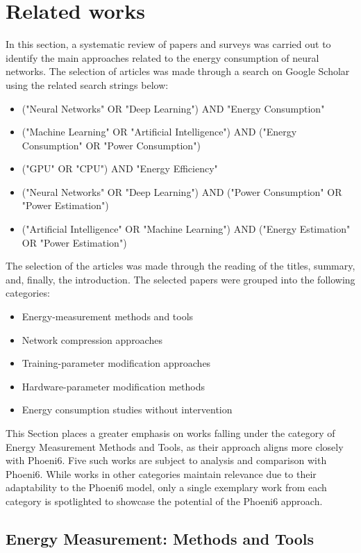 \section{Related works}
\label{sec:related-works}
In this section, a systematic review of papers and surveys was carried out to identify the main approaches related to the energy consumption of neural networks. The selection of articles was made through a search on Google Scholar using the related search strings below:

 \begin{itemize}
    \item ("Neural Networks" OR "Deep Learning") AND "Energy Consumption"
    \item ("Machine Learning" OR "Artificial Intelligence") AND ("Energy Consumption" OR "Power Consumption")
    \item ("GPU" OR "CPU") AND "Energy Efficiency"
    \item ("Neural Networks" OR "Deep Learning") AND ("Power Consumption" OR "Power Estimation")
    \item ("Artificial Intelligence" OR "Machine Learning") AND ("Energy Estimation" OR "Power Estimation")
\end{itemize}
The selection of the articles was made through the reading of the titles, summary, and, finally, the introduction. The selected papers were grouped into the following categories:
 \begin{itemize}
    \item Energy-measurement methods and tools
    \item Network compression approaches
    \item Training-parameter modification approaches
    \item Hardware-parameter modification methods
    \item Energy consumption studies without intervention
\end{itemize}

This Section places a greater emphasis on works falling under the category of Energy Measurement Methods and Tools, as their approach aligns more closely with Phoeni6. Five such works are subject to analysis and comparison with Phoeni6. While works in other categories maintain relevance due to their adaptability to the Phoeni6 model, only a single exemplary work from each category is spotlighted to showcase the potential of the Phoeni6 approach.

\subsection{Energy Measurement: Methods and Tools}

